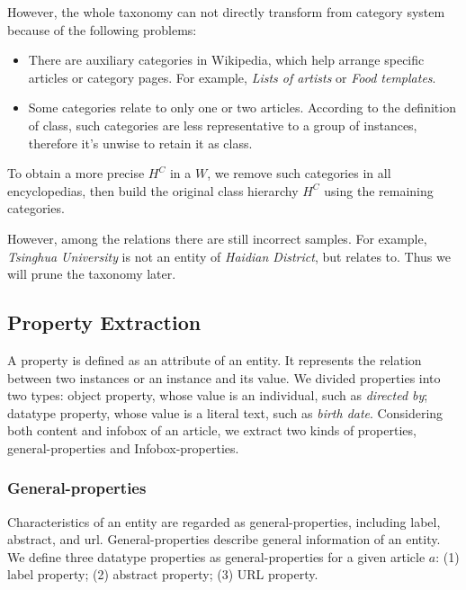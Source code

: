 \documentclass[runningheads,a4paper]{llncs}
\begin{document}
However, the whole taxonomy can not directly transform from category system because of the following problems:
\begin{itemize}
    \item There are auxiliary categories in Wikipedia, which help arrange specific articles or category pages. For example, \emph{Lists of artists} or \emph{Food templates}.
    \item Some categories relate to only one or two articles. According to the definition of class, such categories are less representative to a group of instances, therefore it's unwise to retain it as class.
\end{itemize}
   To obtain a more precise $H^C$ in a $W$, we remove such categories in all encyclopedias, then build the original class hierarchy $H^C$ using the remaining categories.  

However, among the relations there are still incorrect samples. For example, \emph{Tsinghua University} is not an entity of \emph{Haidian District}, but relates to. Thus we will prune the taxonomy later.

\subsection{Property Extraction}
\label{sec:pe}
A property is defined as an attribute of an entity. It represents the relation between two instances or an instance and its value. We divided properties into two types: object property, whose value is an individual, such as \emph{directed by}; datatype property, whose value is a literal text, such as \emph{birth date}. Considering both content and infobox of an article, we extract two kinds of properties, general-properties and Infobox-properties.

\subsubsection{General-properties}
Characteristics of an entity are regarded as general-properties, including label, abstract, and url. General-properties describe general information of an entity. We define three datatype properties as general-properties for a given article $a$: (1) label property; (2) abstract property; (3) URL property.
\end{document}
